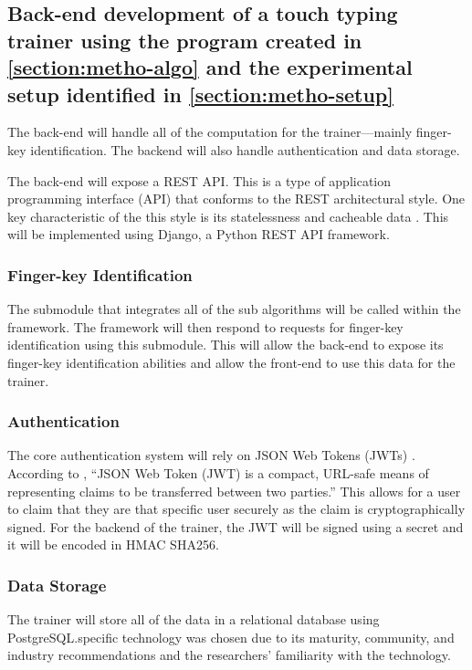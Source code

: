 \documentclass{report}
\begin{document}
\subsection{Back-end development of a touch typing trainer using the program created
	in \ref{section:metho-algo} and the experimental setup identified in
	\ref{section:metho-setup}}

The back-end will handle all of the computation for the trainer---mainly
finger-key identification. The backend will also handle authentication and data
storage.

The back-end will expose a REST API. This is a type of application programming
interface (API) that conforms to the REST architectural style. One key
characteristic of the this style is its statelessness and cacheable data
\parencite{rest}. This will be implemented using Django, a Python REST API
framework.

\subsubsection{Finger-key Identification}
The submodule that integrates all of the sub algorithms will be called within
the framework. The framework will then respond to requests for finger-key
identification using this submodule. This will allow the back-end to expose its
finger-key identification abilities and allow the front-end to use this data for
the trainer.

\subsubsection{Authentication}
The core authentication system will rely on JSON Web Tokens (JWTs) . According
to \cite{jwt}, ``JSON Web Token (JWT) is a compact, URL-safe means of
representing claims to be transferred between two parties.'' This allows for a
user to claim that they are that specific user securely as the claim is
cryptographically signed. For the backend of the trainer, the JWT will be signed
using a secret and it will be encoded in HMAC SHA256.

\subsubsection{Data Storage}
The trainer will store all of the data in a relational database using
PostgreSQL.\@This specific technology was chosen due to its maturity, community,
and industry recommendations and the researchers' familiarity with the
technology.
\end{document}
